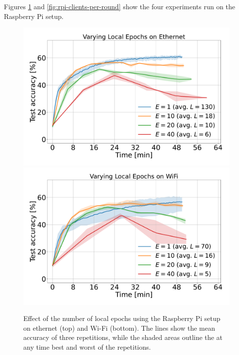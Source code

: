\documentclass{article}
\begin{document}
Figures \ref{fig:rpi-local-epochs} and \ref{fig:rpi-clients-per-round} show the four experiments run on the Raspberry Pi setup.
\begin{figure}[htb!]
    \centering
    \includegraphics[width=\linewidth]{imgs/time_avg_local_epochs_Ethernet.pdf}
    \includegraphics[width=\linewidth]{imgs/time_avg_local_epochs_WiFi.pdf}
    \caption{Effect of the number of local epochs using the Raspberry Pi setup on ethernet (top) and Wi-Fi (bottom).
    The lines show the mean accuracy of three repetitions, while the shaded areas outline the at any time best and worst of the repetitions.}
    \label{fig:rpi-local-epochs}
\end{figure}\noindent
\end{document}
